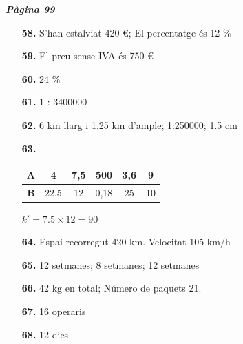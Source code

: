 \documentclass[a4paper, pdf, twoside]{book}
\begin{document}
\begin{multicols}{2}
{\textbf{\em Pàgina 99}} \hrulefill
\begin{enumerate}
\vspace{0.25cm}
\item[\fontfamily{phv}\selectfont\color{blue}\textbf{58. }] 
S'han estalviat 420 \euro {}; El percentatge és 12 \%
 \end{enumerate}
\begin{enumerate}
\vspace{0.25cm}
\item[\fontfamily{phv}\selectfont\color{blue}\textbf{59. }] 
El preu sense IVA és 750 \euro {}
\vspace{0.25cm}
\item[\fontfamily{phv}\selectfont\color{blue}\textbf{60. }] 
24 \%
\vspace{0.25cm}
\item[\fontfamily{phv}\selectfont\color{blue}\textbf{61. }] 
1 : 3400000
\vspace{0.25cm}
\item[\fontfamily{phv}\selectfont\color{blue}\textbf{62. }] 
6 km llarg i 1.25 km d'ample; 1:250000; 1.5 cm
\vspace{0.25cm}
\item[\fontfamily{phv}\selectfont\color{blue}\textbf{63. }] 
\begin {tabular}{|c|c|c|c|c|c|} \hline \textbf { A} & 4 & 7,5 & 500 & 3,6 & 9\tabularnewline \hline \textbf { B} & 22.5 & 12 & 0,18 & 25& 10\tabularnewline \hline \end {tabular}\par $k'=7.5\times 12 = 90$
\vspace{0.25cm}
\item[\fontfamily{phv}\selectfont\color{blue}\textbf{64. }] 
Espai recorregut 420 km. Velocitat 105 km/h
\vspace{0.25cm}
\item[\fontfamily{phv}\selectfont\color{blue}\textbf{65. }] 
12 setmanes; 8 setmanes; 12 setmanes
\vspace{0.25cm}
\item[\fontfamily{phv}\selectfont\color{blue}\textbf{66. }] 
42 kg en total; Número de paquets 21.
\vspace{0.25cm}
\item[\fontfamily{phv}\selectfont\color{blue}\textbf{67. }] 
16 operaris
\vspace{0.25cm}
\item[\fontfamily{phv}\selectfont\color{blue}\textbf{68. }] 
12 dies
\vspace{0.25cm}

\end{enumerate}
\end{multicols}
\end{document}
